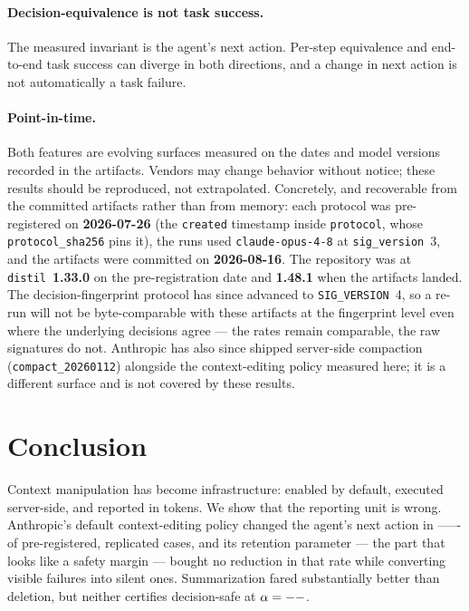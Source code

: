 \documentclass[11pt]{article}
\newcommand{\pcAnthropicDefaultTwoAB}{--}\newcommand{\pcAnthropicDefaultTwoAA}{--}%
\newcommand{\pcAnthropicDefaultOneAB}{--}\newcommand{\pcAnthropicDefaultOneAA}{--}%
\begin{document}
\paragraph{Decision-equivalence is not task success.}
The measured invariant is the agent's next action. Per-step equivalence and
end-to-end task success can diverge in both directions, and a change in next
action is not automatically a task failure.

\paragraph{Point-in-time.}
Both features are evolving surfaces measured on the dates and model versions
recorded in the artifacts. Vendors may change behavior without notice; these
results should be reproduced, not extrapolated. Concretely, and recoverable from the
committed artifacts rather than from memory: each protocol was pre-registered on
\textbf{2026-07-26} (the \texttt{created} timestamp inside \texttt{protocol}, whose
\texttt{protocol\_sha256} pins it), the runs used \texttt{claude-opus-4-8} at
\texttt{sig\_version}~3, and the artifacts were committed on \textbf{2026-08-16}. The
repository was at \texttt{distil}~\textbf{1.33.0} on the pre-registration date and
\textbf{1.48.1} when the artifacts landed. The decision-fingerprint protocol has since
advanced to \texttt{SIG\_VERSION}~4, so a re-run will not be byte-comparable with these
artifacts at the fingerprint level even where the underlying decisions agree --- the rates
remain comparable, the raw signatures do not. Anthropic has also since shipped server-side
compaction (\texttt{compact\_20260112}) alongside the context-editing policy measured here;
it is a different surface and is not covered by these results.

\section{Conclusion}
\label{sec:conclusion}

Context manipulation has become infrastructure: enabled by default, executed
server-side, and reported in tokens. We show that the reporting unit is wrong.
Anthropic's default context-editing policy changed the agent's next action in
\pcAnthropicDefaultOneAB{}--\pcAnthropicDefaultTwoAB{} of pre-registered,
replicated cases, and its retention parameter --- the part that looks like a safety
margin --- bought no reduction in that rate while converting visible failures into
silent ones. Summarization fared substantially better than deletion, but neither
certifies decision-safe at $\alpha=--$.
\end{document}
